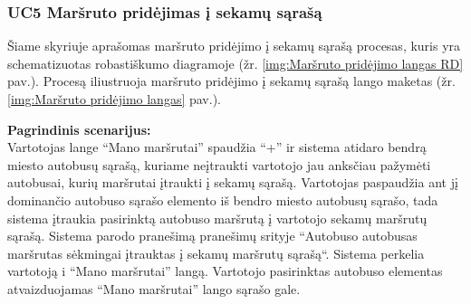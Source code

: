\documentclass{VUMIFPSkursinis}
\begin{document}
\subsubsection{UC5 Maršruto pridėjimas į sekamų sąrašą}
	Šiame skyriuje aprašomas maršruto pridėjimo į sekamų sąrašą procesas, kuris yra schematizuotas robastiškumo diagramoje (žr. \ref{img:Maršruto pridėjimo langas RD} pav.). 
	Procesą iliustruoja maršruto pridėjimo į sekamų sąrašą lango maketas (žr. \ref{img:Maršruto pridėjimo langas} pav.).
	
	\textbf{Pagrindinis scenarijus:}\\
	Vartotojas lange “Mano maršrutai” spaudžia “+” ir sistema atidaro bendrą miesto autobusų sąrašą, kuriame neįtraukti 
	vartotojo jau anksčiau pažymėti autobusai, kurių maršrutai įtraukti į sekamų sąrašą. Vartotojas paspaudžia ant jį 
	dominančio autobuso sąrašo elemento iš bendro miesto autobusų sąrašo, tada sistema įtraukia pasirinktą autobuso maršrutą 
	į vartotojo sekamų maršrutų sąrašą. Sistema parodo pranešimą pranešimų srityje “Autobuso {autobusas} maršrutas sėkmingai 
	įtrauktas į sekamų maršrutų sąrašą“. Sistema perkelia vartotoją i “Mano maršrutai” langą. Vartotojo pasirinktas autobuso 
	elementas atvaizduojamas “Mano maršrutai” lango sąrašo gale.
\end{document}
